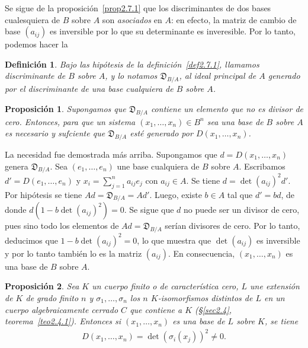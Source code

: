 \documentclass[bibtotoc,leqno,spanish]{amsbook}
\newcommand{\disc}{\mathfrak{D}}
\numberwithin{equation}{section}
\theoremstyle{note}
\newtheorem{definition}{Definici\'on}
\theoremstyle{note}
\newtheorem{proposition}{Proposici\'on}
\theoremstyle{rem}
\numberwithin{theorem}{section}
\numberwithin{proposition}{section}
\numberwithin{definition}{section}
\numberwithin{lemma}{section}
\numberwithin{corollary}{section}
\numberwithin{example}{section}
\numberwithin{footnote}{section}%
\begin{document}
Se sigue de la proposici\'on~\ref{prop2.7.1} que los discriminantes de dos bases cualesquiera de $B$ sobre $A$ son {\em asociados}
en $A$: en efecto, la matriz de cambio de base $(a_{ij})$ es inversible por lo que su determinante es inveresible.
Por lo tanto, podemos hacer la

\begin{definition}\label{def2.7.2}
Bajo las hip\'otesis de la definici\'on~\ref{def2.7.1}, llamamos discriminante de $B$ sobre $A$, y lo notamos $\disc_{B/A}$,
al ideal principal de $A$ generado por el discriminante de una base cualquiera de $B$ sobre $A$.
\end{definition}

\begin{proposition}
Supongamos que $\disc_{B/A}$ contiene un elemento que no es divisor de cero. Entonces, para que un sistema
$(x_{1},\dots,x_{n})\in B^{n}$ sea una base de $B$ sobre $A$ es necesario y sufciente que $\disc_{B/A}$ est\'e
generado por $D(x_{1},\dots,x_{n})$.
\end{proposition}

La necesidad fue demostrada m\'as arriba. Supongamos que $d = D(x_{1},\dots,x_{n})$ genera
$\disc_{B/A}$. Sea $(e_{1},\dots,e_{n})$ une base cualquiera de $B$ sobre $A$.
Escribamos $d' = D(e_{1},\dots,e_{n})$ y $x_{i} = \sum_{j=1}^{n}a_{ij}e_{j}$ con $a_{ij}\in A$. Se tiene
$d = \det(a_{ij})^{2}d'$. Por hip\'otesis se tiene $Ad = \disc_{B/A} = Ad'$. Luego, existe $b\in A$ tal que
$d' = bd$, de donde $d(1-b\det(a_{ij})^{2}) = 0$. Se sigue que $d$ no puede ser un divisor de cero, pues sino
todo los elementos de $Ad = \disc_{B/A}$ ser\'ian divisores de cero. Por lo tanto, deducimos que
$1-b\det(a_{ij})^{2} = 0$, lo que muestra que $\det(a_{ij})$ es inversible y por lo tanto tambi\'en lo es
la matriz $(a_{ij})$. En consecuencia, $(x_{1},\dots,x_{n})$ es una base de $B$ sobre $A$.

\begin{proposition}\label{prop2.7.3}
Sea $K$ un cuerpo finito o de caracter\'istica cero, $L$ une extensi\'on de $K$ de grado finito $n$ y
$\sigma_{1},\dots,\sigma_{n}$ los $n$ $K$-isomorfismos distintos de $L$ en un cuerpo algebraicamente cerrado
$C$ que contiene a $K$ (\S\ref{sec2.4}, teorema~\ref{teo2.4.1}). Entonces si $(x_{1},\dots,x_{n})$ es una base de $L$ sobre $K$, se tiene
\begin{gather}
D(x_{1},\dots,x_{n}) = \det(\sigma_{i}(x_{j}))^{2}\neq 0.
\end{gather}
\end{proposition}
\end{document}
